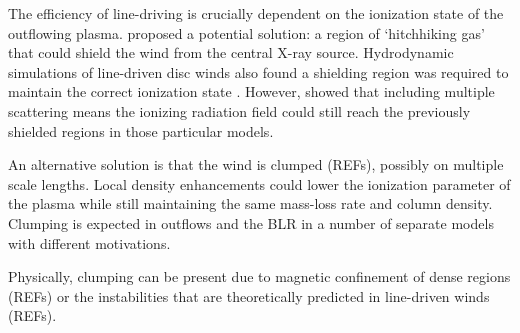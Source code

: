 \documentclass[preprint, a4paper, 11pt]{aastex}
\begin{document}
The efficiency of line-driving is crucially dependent on the ionization state 
of the outflowing plasma. \cite{MCGV95} proposed a potential solution: 
a region of `hitchhiking gas' that could shield the wind from the central X-ray source. 
Hydrodynamic simulations of line-driven disc winds also found a shielding region
was required to maintain the correct ionization state \citep{PSK2000,PK04}. 
However, \cite{H14} showed that including multiple scattering means the ionizing radiation 
field could still reach the previously shielded regions in those particular models.

An alternative solution is that the wind is clumped (REFs), possibly on multiple scale lengths.
Local density enhancements could lower the ionization parameter of the plasma
while still maintaining the same mass-loss rate and column density. 
Clumping is expected in outflows and the BLR in a number of separate models
with different motivations. 

Physically, clumping can be present due to magnetic confinement of 
dense regions (REFs) or the instabilities that are theoretically predicted 
in line-driven winds (REFs). 





\end{document}
